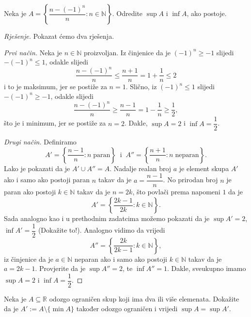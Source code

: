 \begin{exercise}
Neka je $A=\left\{\dfrac{n-(-1)^n}{n} : n\in \mathbb{N}\right\}$. Odredite $\sup{A}$ i $\inf{A}$, ako postoje.
\end{exercise}
\begin{proof}[Rješenje]
Pokazat ćemo dva rješenja.

\textit{Prvi način.} Neka je $n\in \mathbb{N}$ proizvoljan. Iz činjenice da je $(-1)^n\geq -1$ slijedi $-(-1)^n\leq 1$, odakle slijedi
$$\dfrac{n-(-1)^n}{n}\leq \dfrac{n+1}{n}=1+\dfrac{1}{n}\leq 2$$
i to je maksimum, jer se postiže za $n=1$. Slično, iz $(-1)^n\leq 1$ slijedi $-(-1)^n\geq -1$, odakle slijedi
$$\dfrac{n-(-1)^n}{n}\geq \dfrac{n-1}{n}=1-\dfrac{1}{n}\geq \dfrac{1}{2},$$
što je i minimum, jer se postiže za $n=2$. Dakle, $\sup{A}=2$ i $\inf{A}=\dfrac{1}{2}$.

\textit{Drugi način.} Definiramo
$$A'=\left\{\dfrac{n-1}{n} : n \;\mathrm{paran}\right\}\;\;\text{i}\;\;A''=\left\{\dfrac{n+1}{n} : n \;\mathrm{neparan}\right\}.$$ Lako je pokazati da je $A'\cup A''=A$. Nadalje realan broj $a$ je element skupa $A'$ ako i samo ako postoji paran $n$ takav da je $a=\dfrac{n-1}{n}$. No prirodan broj $n$ je paran ako postoji $k\in \mathbb{N}$ takav da je $n=2k$, što povlači prema napomeni $1$ da je $$A'=\left\{\dfrac{2k-1}{2k} : k\in \mathbb{N}\right\}.$$ Sada analogno kao i u prethodnim zadatcima možemo pokazati da je $\sup{A'}=2$, $\inf{A'}=\dfrac{1}{2}$ (Dokažite to!). Analogno vidimo da vrijedi $$A''=\left\{\dfrac{2k}{2k-1} : k\in \mathbb{N}\right\},$$ iz činjenice da je $a\in \mathbb{N}$ neparan ako i samo ako postoji $k\in \mathbb{N}$ takav da je $a=2k-1$. Provjerite da je $\sup{A''}=2$, te $\inf{A''}=1$. Dakle, sveukupno imamo $\sup{A}=2$ i $\inf{A}=\dfrac{1}{2}$.
\end{proof}
\begin{exercise}
Neka je $A\subseteq \mathbb{R}$ odozgo ograničen skup koji ima dva ili više elemenata. Dokažite da je $A':=A\setminus \{\min{A}\}$ također odozgo ograničen i vrijedi $\sup{A}=\sup{A'}$.
\end{exercise}
